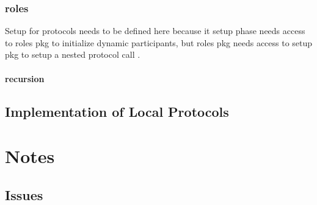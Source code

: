 \documentclass[12pt,twoside]{report}
\begin{document}
\subsection{roles}
Setup for protocols needs to be defined here because it setup phase needs access to roles pkg to initialize dynamic participants, but roles pkg needs access to setup pkg to setup a nested protocol call .
\subsubsection{recursion}

\section{Implementation of Local Protocols}\label{local-protocol-codegen}





\chapter{Notes}

\section{Issues}
\end{document}
